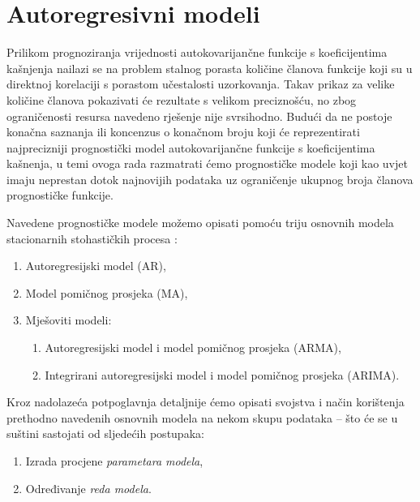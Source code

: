 \documentclass[a4paper,12pt,oneside]{memoir}
\begin{document}
    \chapter{Autoregresivni modeli}
            
        Prilikom prognoziranja vrijednosti autokovarijančne funkcije s koeficijentima kašnjenja nailazi se na problem stalnog porasta količine članova funkcije koji su u direktnoj korelaciji s porastom učestalosti uzorkovanja. Takav prikaz za velike količine članova pokazivati će rezultate s velikom preciznošću, no zbog ograničenosti resursa navedeno rješenje nije svrsihodno. Budući da ne postoje konačna saznanja ili koncenzus o konačnom broju koji će reprezentirati najprecizniji prognostički model autokovarijančne funkcije s koeficijentima kašnenja, u temi ovoga rada razmatrati ćemo prognostičke modele koji kao uvjet imaju neprestan dotok najnovijih podataka uz ograničenje ukupnog broja članova prognostičke funkcije.

        Navedene prognostičke modele možemo opisati pomoću triju osnovnih modela stacionarnih stohastičkih procesa \cite{Broersen}:
        
        \begin{enumerate}
            \item Autoregresijski model (AR),
            \item Model pomičnog prosjeka (MA),
            \item Mješoviti modeli:
            \begin{enumerate}
                \item Autoregresijski model i model pomičnog prosjeka (ARMA),
                \item Integrirani autoregresijski model i model pomičnog prosjeka (ARIMA).
            \end{enumerate}
        \end{enumerate}
        
        Kroz nadolazeća potpoglavnja detaljnije ćemo opisati svojstva i način korištenja prethodno navedenih osnovnih modela na nekom skupu podataka -- što će se u suštini sastojati od sljedećih postupaka:
        
        \begin{enumerate}
            \item Izrada procjene \textit{parametara modela},
            \item Određivanje \textit{reda modela}.
        \end{enumerate}
\end{document}
